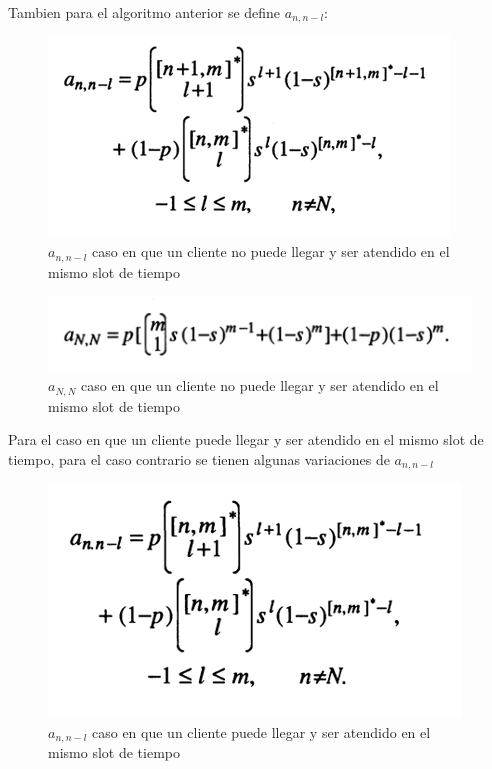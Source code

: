 \documentclass{article}
\begin{document}
Tambien para el algoritmo anterior se define $a_{n,n-l}$:
\begin{figure}[H]
    \centering
    \includegraphics[width=0.75\linewidth]{images/imageGeoGeoMCalc1.png}
    \caption{$a_{n,n-l}$ caso en que un cliente no puede llegar y ser atendido en el mismo slot de tiempo}
    \label{fig:enter-label}
\end{figure}

\begin{figure} [H]
    \centering
    \includegraphics[width=0.75\linewidth]{images/imageGeoGeoMCalc2.png}
    \caption{$a_{N,N}$ caso en que un cliente no puede llegar y ser atendido en el mismo slot de tiempo}
    \label{fig:enter-label}
\end{figure}

Para el caso en que un cliente puede llegar y ser atendido en el mismo slot de tiempo, para el caso contrario se tienen algunas variaciones de $a_{n,n-l}$

\begin{figure}[H]
    \centering
    \includegraphics[width=0.75\linewidth]{images/imageGeoGeoMCalc3.png}
    \caption{$a_{n,n-l}$ caso en que un cliente puede llegar y ser atendido en el mismo slot de tiempo}
    \label{fig:enter-label}
\end{figure}
\end{document}
